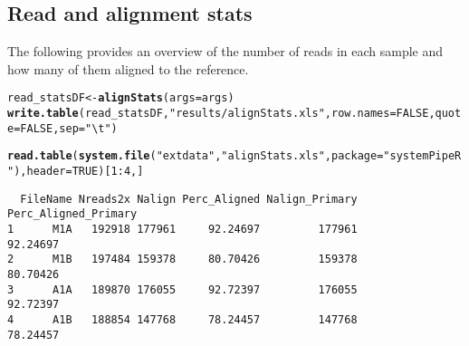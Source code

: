 \documentclass{article}\usepackage[]{graphicx}\usepackage[]{color}
\makeatletter
\newcommand{\hlnum}[1]{\textcolor[rgb]{0.686,0.059,0.569}{#1}}%
\newcommand{\hlstr}[1]{\textcolor[rgb]{0.192,0.494,0.8}{#1}}%
\newcommand{\hlopt}[1]{\textcolor[rgb]{0,0,0}{#1}}%
\newcommand{\hlstd}[1]{\textcolor[rgb]{0.345,0.345,0.345}{#1}}%
\newcommand{\hlkwb}[1]{\textcolor[rgb]{0.69,0.353,0.396}{#1}}%
\newcommand{\hlkwc}[1]{\textcolor[rgb]{0.333,0.667,0.333}{#1}}%
\newcommand{\hlkwd}[1]{\textcolor[rgb]{0.737,0.353,0.396}{\textbf{#1}}}%
\newenvironment{kframe}{%
 \def\at@end@of@kframe{}%
 \ifinner\ifhmode%
  \def\at@end@of@kframe{\end{minipage}}%
  \begin{minipage}{\columnwidth}%
 \fi\fi%
 \def\FrameCommand##1{\hskip\@totalleftmargin \hskip-\fboxsep
 \colorbox{shadecolor}{##1}\hskip-\fboxsep
     \hskip-\linewidth \hskip-\@totalleftmargin \hskip\columnwidth}%
 \MakeFramed {\advance\hsize-\width
   \@totalleftmargin\z@ \linewidth\hsize
   \@setminipage}}%
 {\par\unskip\endMakeFramed%
 \at@end@of@kframe}
\newenvironment{knitrout}{}{} %
\makeatother
\begin{document}
\subsection{Read and alignment stats}
The following provides an overview of the number of reads in each sample and how many of them aligned to the reference.
\begin{knitrout}
\color{fgcolor}\begin{kframe}
\begin{alltt}
\hlstd{read_statsDF} \hlkwb{<-} \hlkwd{alignStats}\hlstd{(}\hlkwc{args}\hlstd{=args)}
\hlkwd{write.table}\hlstd{(read_statsDF,} \hlstr{"results/alignStats.xls"}\hlstd{,} \hlkwc{row.names}\hlstd{=}\hlnum{FALSE}\hlstd{,} \hlkwc{quote}\hlstd{=}\hlnum{FALSE}\hlstd{,} \hlkwc{sep}\hlstd{=}\hlstr{"\textbackslash{}t"}\hlstd{)}
\end{alltt}
\end{kframe}
\end{knitrout}
\begin{knitrout}
\color{fgcolor}\begin{kframe}
\begin{alltt}
\hlkwd{read.table}\hlstd{(}\hlkwd{system.file}\hlstd{(}\hlstr{"extdata"}\hlstd{,} \hlstr{"alignStats.xls"}\hlstd{,} \hlkwc{package}\hlstd{=}\hlstr{"systemPipeR"}\hlstd{),} \hlkwc{header}\hlstd{=}\hlnum{TRUE}\hlstd{)[}\hlnum{1}\hlopt{:}\hlnum{4}\hlstd{,]}
\end{alltt}
\begin{verbatim}
  FileName Nreads2x Nalign Perc_Aligned Nalign_Primary Perc_Aligned_Primary
1      M1A   192918 177961     92.24697         177961             92.24697
2      M1B   197484 159378     80.70426         159378             80.70426
3      A1A   189870 176055     92.72397         176055             92.72397
4      A1B   188854 147768     78.24457         147768             78.24457
\end{verbatim}
\end{kframe}
\end{knitrout}
\end{document}
